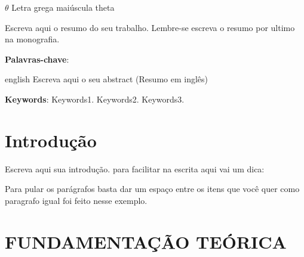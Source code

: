\documentclass[
	12pt,				%
	openright,			%
	oneside,			%
	a4paper,			%
	chapter=TITLE,		%
	section=TITLE,		%
	subsection=TITLE,	%
	subsubsection=TITLE,%
	english,			%
	brazil				%
	]{abntex2}
\theoremstyle{definition}
\begin{document}
\begin{simbolos}
  \item[$ \theta $] Letra grega maiúscula theta
\end{simbolos}

\setlength{\absparsep}{18pt} %
\begin{resumo}

Escreva aqui o resumo do seu trabalho. Lembre-se escreva o resumo por ultimo na monografia. 

 \textbf{Palavras-chave}: \imprimirpalavraschave
\end{resumo}

\begin{resumo}[Abstract]
 \begin{otherlanguage*}{english}
   Escreva aqui o seu abstract (Resumo em inglês)

   \vspace{\onelineskip}
 
   \noindent 
   \textbf{Keywords}: Keywords1. Keywords2. Keywords3.
 \end{otherlanguage*}
\end{resumo}

\tableofcontents*
\cleardoublepage



\textual
\pagestyle{simple}

\chapter{Introdução}

Escreva aqui sua introdução. para facilitar na escrita aqui vai um dica:

Para pular os parágrafos basta dar um espaço entre os itens que você quer como paragrafo igual foi feito nesse exemplo.

\chapter{FUNDAMENTAÇÃO TEÓRICA}
\end{document}

